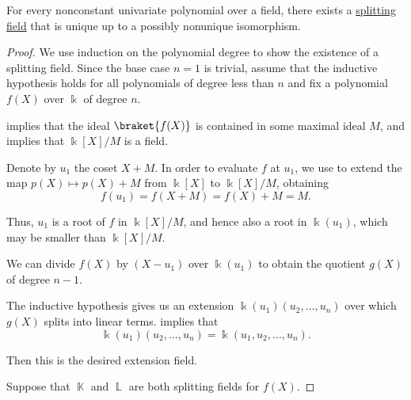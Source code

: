 \begin{proposition}\label{thm:splitting_field_existence}
  For every nonconstant univariate polynomial over a field, there exists a \hyperref[def:splitting_field]{splitting field} that is unique up to a possibly nonunique isomorphism.
\end{proposition}
\begin{proof}
  \ExistenceSubProof We use induction on the polynomial degree to show the existence of a splitting field. Since the base case \( n = 1 \) is trivial, assume that the inductive hypothesis holds for all polynomials of degree less than \( n \) and fix a polynomial \( f(X) \) over \( \Bbbk \) of degree \( n \).

   implies that the ideal \( \braket{ f(X) } \) is contained in some maximal ideal \( M \), and  implies that \( \Bbbk[X] / M \) is a field.

  Denote by \( u_1 \) the coset \( X + M \). In order to evaluate \( f \) at \( u_1 \), we use  to extend the map \( p(X) \mapsto p(X) + M \) from \( \Bbbk[X] \) to \(\Bbbk[X] / M \), obtaining
  \begin{equation*}
    f(u_1) = f(X + M) = f(X) + M = M.
  \end{equation*}

  Thus, \( u_1 \) is a root of \( f \) in \( \Bbbk[X] / M \), and hence also a root in \( \Bbbk(u_1) \), which may be smaller than \( \Bbbk[X] / M \).

  We can divide \( f(X) \) by \( (X - u_1) \) over \( \Bbbk(u_1) \) to obtain the quotient \( g(X) \) of degree \( n - 1 \).

  The inductive hypothesis gives us an extension \( \Bbbk(u_1)(u_2, \ldots, u_n) \) over which \( g(X) \) splits into linear terms.  implies that
  \begin{equation*}
    \Bbbk(u_1)(u_2, \ldots, u_n) = \Bbbk(u_1, u_2, \ldots, u_n).
  \end{equation*}

  Then this is the desired extension field.

  \UniquenessSubProof Suppose that \( \BbbK \) and \( \BbbL \) are both splitting fields for \( f(X) \).
\end{proof}

